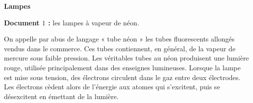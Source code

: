 \newpage

\exo \textbf{Lampes}

\vspace{0.3cm}


\textbf{Document $1$ :} les lampes à vapeur de néon.

\vspace{0.3cm}

On appelle par abus de langage « tube néon » les tubes fluorescents allongés vendus dans le
commerce. Ces tubes contiennent, en général, de la vapeur de mercure sous faible pression. Les véritables tubes au néon produisent une lumière rouge, utilisée principalement dans des enseignes lumineuses. Lorsque la lampe est mise sous tension, des électrons circulent dans le gaz entre deux électrodes. Les électrons cèdent alors de l'énergie
aux atomes qui s'excitent, puis se désexcitent en émettant de la lumière.

\vspace{0.3cm}

